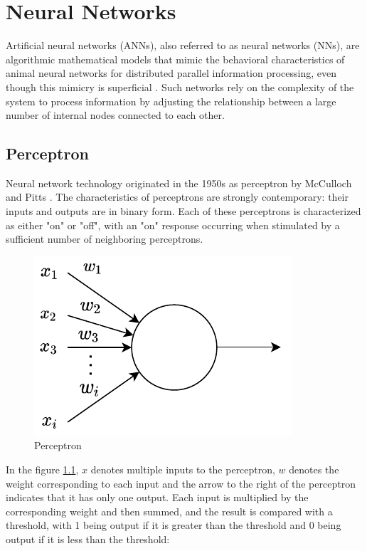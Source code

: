 \documentclass[
	parskip, 			   %
	twoside, 			   %
	DIV=14, 			   %
	BCOR=15.0mm, 		   %
	headsepline, 		   %
	open=right, 		   %
	captions=tableheading, %
	bibliography=totoc,    %
	numbers=noenddot       %
]{scrreprt}
\begin{document}
\clearpage
\chapter{Neural Networks}
\label{ch:chapter4}
Artificial neural networks (ANNs), also referred to as neural networks (NNs), are algorithmic mathematical models that mimic the behavioral characteristics of animal neural networks for distributed parallel information processing, even though this mimicry is superficial \cite{russell2010artificial}. Such networks rely on the complexity of the system to process information by adjusting the relationship between a large number of internal nodes connected to each other.

\section{Perceptron}
Neural network technology originated in the 1950s as perceptron by McCulloch and Pitts \cite{mcculloch1943logical}. The characteristics of perceptrons are strongly contemporary: their inputs and outputs are in binary form. Each of these perceptrons is characterized as either "on" or "off", with an "on" response occurring when stimulated by a sufficient number of neighboring perceptrons.

\begin{figure}[h!]
    \centering
    \includegraphics[scale=1]{figures/perceptron.pdf}
    \caption{Perceptron}
    \label{fig:perceptron}
\end{figure}

In the figure \ref{fig:perceptron}, $x$ denotes multiple inputs to the perceptron, $w$ denotes the weight corresponding to each input and the arrow to the right of the perceptron indicates that it has only one output. Each input is multiplied by the corresponding weight and then summed, and the result is compared with a threshold, with 1 being output if it is greater than the threshold and 0 being output if it is less than the threshold:
\end{document}
